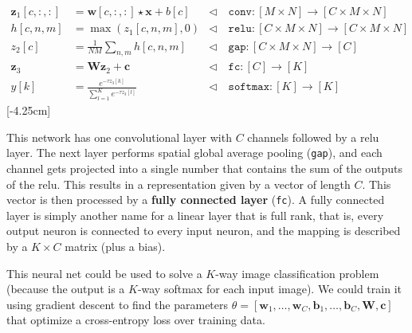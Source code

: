 \begin{align}
    \mathbf{z}_1[c,:,:] & = \mathbf{w}[c,:,:] \star \mathbf{x} + b[c]              & \triangleleft \quad \texttt{conv}: [M \times N] \rightarrow [C \times M \times N]          \\
    h[c,n,m]            & = \max(z_1[c,n,m],0)                                     & \triangleleft \quad \texttt{relu}: [C \times M \times N] \rightarrow [C \times M \times N] \\
    z_2[c]              & = \frac{1}{NM} \sum_{n,m} h[c,n,m]                       & \triangleleft \quad \texttt{gap}: [C \times M \times N] \rightarrow [C]                    \\
    \mathbf{z}_{3}      & = \mathbf{W} \mathbf{z}_{2} + \mathbf{c}                 & \triangleleft \quad \texttt{fc}: [C] \rightarrow [K]                                       \\
    y[k]                & = \frac{e^{-\tau z_3[k]}}{\sum_{l=1}^K e^{-\tau z_3[l]}} & \triangleleft \quad \texttt{softmax}: [K] \rightarrow [K]
\end{align}
[-4.25cm]

This network has one convolutional layer with $C$ channels followed by a relu layer. The next layer performs spatial global average pooling (\texttt{gap}), and each channel gets projected into a single number that contains the sum of the outputs of the relu. This results in a representation given by a vector of length $C$. This vector is then processed by a \textbf{fully connected layer} (\texttt{fc}). A fully connected layer is simply another name for a linear layer that is full rank, that is, every output neuron is connected to every input neuron, and the mapping is described by a $K \times C$ matrix (plus a bias).

This neural net could be used to solve a $K$-way image classification problem (because the output is a $K$-way softmax for each input image). We could train it using gradient descent to find the parameters $\theta = [\mathbf{w}_1, \ldots, \mathbf{w}_C, \mathbf{b}_1, \ldots, \mathbf{b}_C, \mathbf{W}, \mathbf{c}]$ that optimize a cross-entropy loss over training data.


